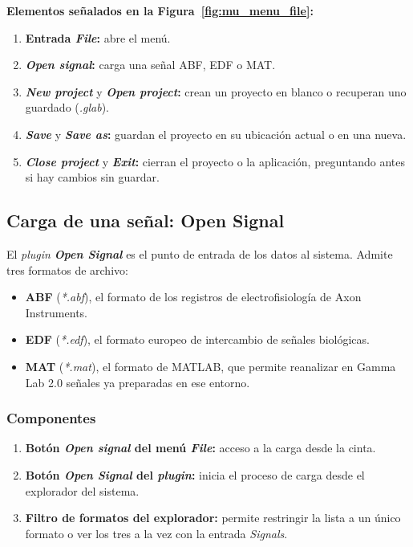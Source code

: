 \documentclass[11pt,a4paper]{article}
\newenvironment{senalamientos}[1]{%
  \par\noindent\textbf{Elementos se\~nalados en la Figura~\ref{#1}:}%
  \begin{enumerate}[label=(\arabic*),leftmargin=2.4em,itemsep=2pt,topsep=4pt]}
  {\end{enumerate}}
\begin{document}
    \begin{senalamientos}{fig:mu_menu_file}
        \item \textbf{Entrada \textit{File}:} abre el men\'u.
        \item \textbf{\textit{Open signal}:} carga una se\~nal ABF, EDF o MAT.
        \item \textbf{\textit{New project}} y \textbf{\textit{Open project}:} crean un proyecto en blanco o recuperan uno guardado (\textit{.glab}).
        \item \textbf{\textit{Save}} y \textbf{\textit{Save as}:} guardan el proyecto en su ubicaci\'on actual o en una nueva.
        \item \textbf{\textit{Close project}} y \textbf{\textit{Exit}:} cierran el proyecto o la aplicaci\'on, preguntando antes si hay cambios sin guardar.
    \end{senalamientos}


    \subsection{Carga de una se\~nal: Open Signal}
    El \textit{plugin} \textbf{\textit{Open Signal}} es el punto de entrada de los datos al sistema. Admite tres formatos de archivo:

    \begin{itemize}
        \item \textbf{ABF} (\textit{*.abf}), el formato de los registros de electrofisiolog\'ia de Axon Instruments.
        \item \textbf{EDF} (\textit{*.edf}), el formato europeo de intercambio de se\~nales biol\'ogicas.
        \item \textbf{MAT} (\textit{*.mat}), el formato de MATLAB, que permite reanalizar en Gamma Lab 2.0 se\~nales ya preparadas en ese entorno.
    \end{itemize}

    \subsubsection*{Componentes}
    \begin{enumerate}
        \item \textbf{Bot\'on \textit{Open signal} del men\'u \textit{File}:} acceso a la carga desde la cinta.
        \item \textbf{Bot\'on \textit{Open Signal} del \textit{plugin}:} inicia el proceso de carga desde el explorador del sistema.
        \item \textbf{Filtro de formatos del explorador:} permite restringir la lista a un \'unico formato o ver los tres a la vez con la entrada \emph{Signals}.
    \end{enumerate}
\end{document}
